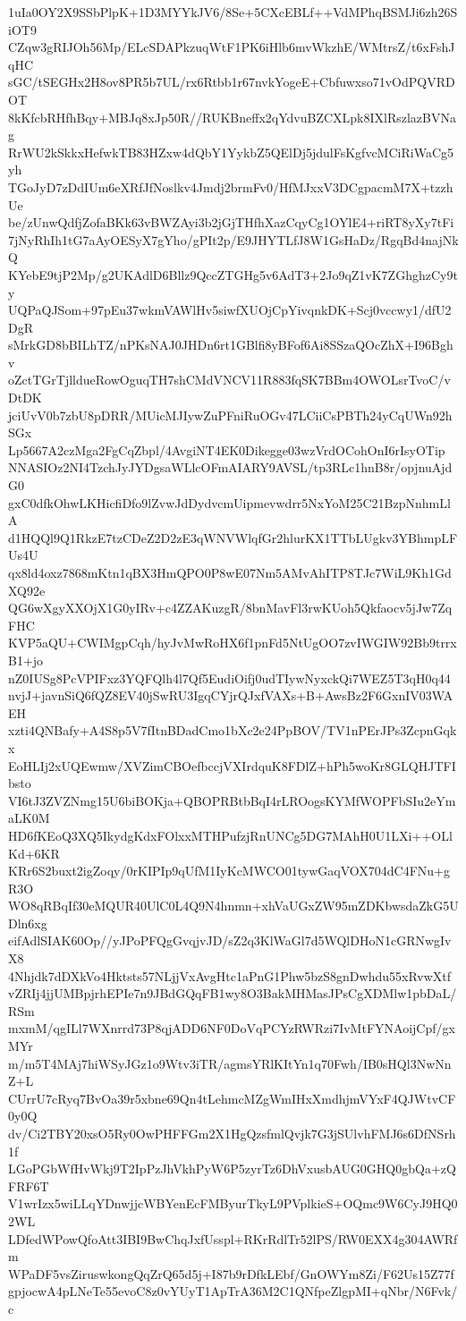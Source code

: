 1uIa0OY2X9SSbPlpK+1D3MYYkJV6/8Se+5CXcEBLf++VdMPhqBSMJi6zh26SiOT9
CZqw3gRIJOh56Mp/ELcSDAPkzuqWtF1PK6iHlb6mvWkzhE/WMtrsZ/t6xFshJqHC
sGC/tSEGHx2H8ov8PR5b7UL/rx6Rtbb1r67nvkYogeE+Cbfuwxso71vOdPQVRDOT
8kKfcbRHfhBqy+MBJq8xJp50R//RUKBneffx2qYdvuBZCXLpk8IXlRszlazBVNag
RrWU2kSkkxHefwkTB83HZxw4dQbY1YykbZ5QElDj5jdulFsKgfvcMCiRiWaCg5yh
TGoJyD7zDdIUm6eXRfJfNoslkv4Jmdj2brmFv0/HfMJxxV3DCgpacmM7X+tzzhUe
be/zUnwQdfjZofaBKk63vBWZAyi3b2jGjTHfhXazCqyCg1OYlE4+riRT8yXy7tFi
7jNyRhIh1tG7aAyOESyX7gYho/gPIt2p/E9JHYTLfJ8W1GsHaDz/RgqBd4najNkQ
KYebE9tjP2Mp/g2UKAdlD6Bllz9QccZTGHg5v6AdT3+2Jo9qZ1vK7ZGhghzCy9ty
UQPaQJSom+97pEu37wkmVAWlHv5siwfXUOjCpYivqnkDK+Scj0vccwy1/dfU2DgR
sMrkGD8bBILhTZ/nPKsNAJ0JHDn6rt1GBlfi8yBFof6Ai8SSzaQOcZhX+I96Bghv
oZctTGrTjlldueRowOguqTH7shCMdVNCV11R883fqSK7BBm4OWOLsrTvoC/vDtDK
jciUvV0b7zbU8pDRR/MUicMJIywZuPFniRuOGv47LCiiCsPBTh24yCqUWn92hSGx
Lp5667A2czMga2FgCqZbpl/4AvgiNT4EK0Dikegge03wzVrdOCohOnI6rIsyOTip
NNASIOz2NI4TzchJyJYDgsaWLlcOFmAIARY9AVSL/tp3RLc1hnB8r/opjnuAjdG0
gxC0dfkOhwLKHicfiDfo9lZvwJdDydvcmUipmevwdrr5NxYoM25C21BzpNnhmLlA
d1HQQl9Q1RkzE7tzCDeZ2D2zE3qWNVWlqfGr2hlurKX1TTbLUgkv3YBhmpLFUs4U
qx8ld4oxz7868mKtn1qBX3HmQPO0P8wE07Nm5AMvAhITP8TJc7WiL9Kh1GdXQ92e
QG6wXgyXXOjX1G0yIRv+c4ZZAKuzgR/8bnMavFl3rwKUoh5Qkfaocv5jJw7ZqFHC
KVP5aQU+CWIMgpCqh/hyJvMwRoHX6f1pnFd5NtUgOO7zvIWGIW92Bb9trrxB1+jo
nZ0IUSg8PcVPIFxz3YQFQlh4l7Qf5EudiOifj0udTIywNyxckQi7WEZ5T3qH0q44
nvjJ+javnSiQ6fQZ8EV40jSwRU3IgqCYjrQJxfVAXs+B+AwsBz2F6GxnIV03WAEH
xzti4QNBafy+A4S8p5V7fItnBDadCmo1bXc2e24PpBOV/TV1nPErJPs3ZcpnGqkx
EoHLIj2xUQEwmw/XVZimCBOefbccjVXIrdquK8FDlZ+hPh5woKr8GLQHJTFIbsto
VI6tJ3ZVZNmg15U6biBOKja+QBOPRBtbBqI4rLROogsKYMfWOPFbSIu2eYmaLK0M
HD6fKEoQ3XQ5IkydgKdxFOlxxMTHPufzjRnUNCg5DG7MAhH0U1LXi++OLlKd+6KR
KRr6S2buxt2igZoqy/0rKIPIp9qUfM1IyKcMWCO01tywGaqVOX704dC4FNu+gR3O
WO8qRBqIf30eMQUR40UlC0L4Q9N4hnmn+xhVaUGxZW95mZDKbwsdaZkG5UDln6xg
eifAdlSIAK60Op//yJPoPFQgGvqjvJD/sZ2q3KlWaGl7d5WQlDHoN1cGRNwgIvX8
4Nhjdk7dDXkVo4Hktsts57NLjjVxAvgHtc1aPnG1Phw5bzS8gnDwhdu55xRvwXtf
vZRIj4jjUMBpjrhEPIe7n9JBdGQqFB1wy8O3BakMHMasJPsCgXDMlw1pbDaL/RSm
mxmM/qgILl7WXnrrd73P8qjADD6NF0DoVqPCYzRWRzi7IvMtFYNAoijCpf/gxMYr
m/m5T4MAj7hiWSyJGz1o9Wtv3iTR/agmsYRlKItYn1q70Fwh/IB0sHQl3NwNnZ+L
CUrrU7cRyq7BvOa39r5xbne69Qn4tLehmcMZgWmIHxXmdhjmVYxF4QJWtvCF0y0Q
dv/Ci2TBY20xsO5Ry0OwPHFFGm2X1HgQzsfmlQvjk7G3jSUlvhFMJ6s6DfNSrh1f
LGoPGbWfHvWkj9T2IpPzJhVkhPyW6P5zyrTz6DhVxusbAUG0GHQ0gbQa+zQFRF6T
V1wrIzx5wiLLqYDnwjjcWBYenEcFMByurTkyL9PVplkieS+OQmc9W6CyJ9HQ02WL
LDfedWPowQfoAtt3IBI9BwChqJxfUsspl+RKrRdlTr52lPS/RW0EXX4g304AWRfm
WPaDF5vsZiruswkongQqZrQ65d5j+I87b9rDfkLEbf/GnOWYm8Zi/F62Us15Z77f
gpjocwA4pLNeTe55evoC8z0vYUyT1ApTrA36M2C1QNfpeZlgpMI+qNbr/N6Fvk/c
